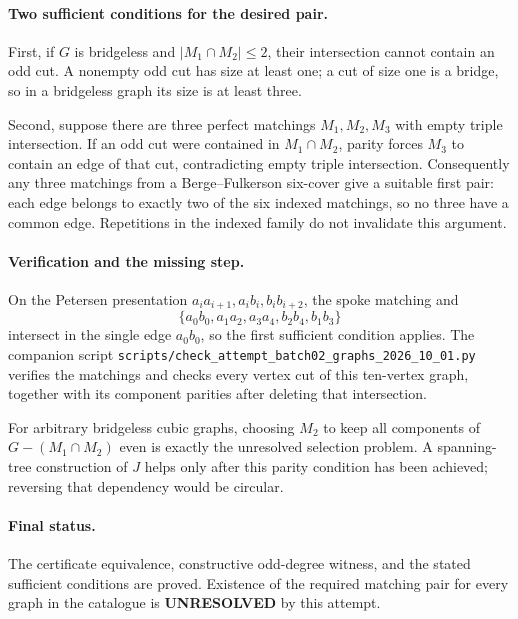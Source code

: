 \documentclass[11pt,a4paper]{article}
\begin{document}
\paragraph{Two sufficient conditions for the desired pair.}
First, if $G$ is bridgeless and $|M_1\cap M_2|\le2$, their intersection cannot contain an odd cut. A nonempty odd cut has size at least one; a cut of size one is a bridge, so in a bridgeless graph its size is at least three.

Second, suppose there are three perfect matchings $M_1,M_2,M_3$ with empty triple intersection. If an odd cut were contained in $M_1\cap M_2$, parity forces $M_3$ to contain an edge of that cut, contradicting empty triple intersection. Consequently any three matchings from a Berge--Fulkerson six-cover give a suitable first pair: each edge belongs to exactly two of the six indexed matchings, so no three have a common edge. Repetitions in the indexed family do not invalidate this argument.

\paragraph{Verification and the missing step.}
On the Petersen presentation $a_i a_{i+1},a_i b_i,b_i b_{i+2}$, the spoke matching and
\[
 \{a_0b_0,a_1a_2,a_3a_4,b_2b_4,b_1b_3\}
\]
intersect in the single edge $a_0b_0$, so the first sufficient condition applies. The companion script \texttt{scripts/check\_attempt\_batch02\_graphs\_2026\_10\_01.py} verifies the matchings and checks every vertex cut of this ten-vertex graph, together with its component parities after deleting that intersection.

For arbitrary bridgeless cubic graphs, choosing $M_2$ to keep all components of $G-(M_1\cap M_2)$ even is exactly the unresolved selection problem. A spanning-tree construction of $J$ helps only after this parity condition has been achieved; reversing that dependency would be circular.

\paragraph{Final status.}
The certificate equivalence, constructive odd-degree witness, and the stated sufficient conditions are proved. Existence of the required matching pair for every graph in the catalogue is \textbf{UNRESOLVED} by this attempt.
\end{document}
